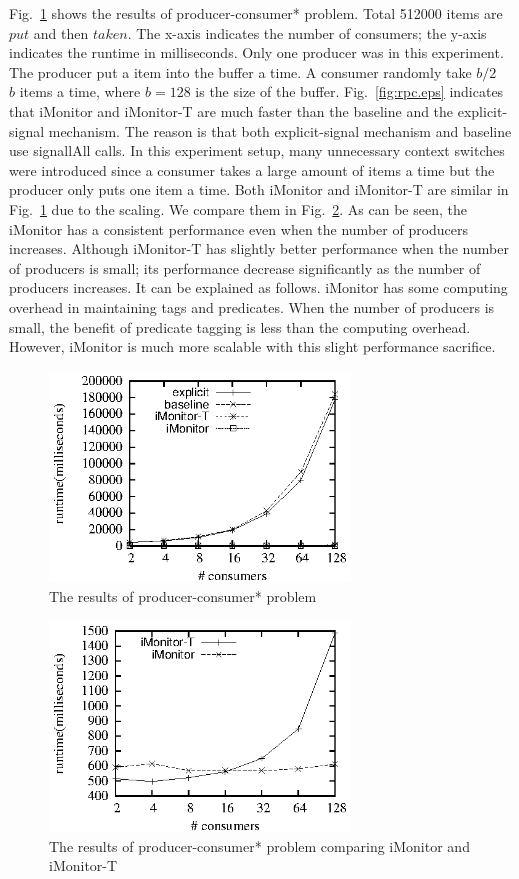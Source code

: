 \documentclass[preprint]{sigplanconf}
\begin{document}
Fig.~\ref{fig:rpc_eval} shows the results of producer-consumer* problem. Total
512000 items are $put$ and then $taken$. The x-axis indicates the number of 
consumers; the y-axis indicates the runtime in milliseconds. Only one producer
was in this experiment. The producer put a item into the buffer a time. A 
consumer randomly take $b/2$ ~ $b$ items a time, where $b = 128$ is the size of 
the buffer. Fig.~\ref{fig:rpc.eps} indicates that iMonitor and iMonitor-T are
much faster than the baseline and the explicit-signal mechanism. The reason is
that both explicit-signal mechanism and baseline use signallAll calls. In this
experiment setup, many unnecessary context switches were introduced since a
consumer takes a large amount of items a time but the producer only puts one
item a time. Both iMonitor and iMonitor-T are similar in
Fig.~\ref{fig:rpc_eval} due to the scaling. We compare them in
Fig.~\ref{fig:rpch_eval}. As can be seen, the iMonitor has a consistent
performance even when the number of producers increases. Although iMonitor-T has
slightly better performance when the number of producers is small; its 
performance decrease significantly as the number of producers increases. It can
be explained as follows. iMonitor has some computing overhead in maintaining 
tags and predicates. When the number of producers is small, the benefit of
predicate tagging is less than the computing overhead. However, iMonitor is
much more scalable with this slight performance sacrifice.

\begin{figure}[ht!]
  \centering
  \includegraphics[width=80mm]{fig/rpc.eps}
  \caption{The results of producer-consumer* problem}
  \label{fig:rpc_eval}
\end{figure}

\begin{figure}[ht!]
  \centering
  \includegraphics[width=80mm]{fig/rpch.eps}
  \caption{The results of producer-consumer* problem comparing iMonitor and
  iMonitor-T}
  \label{fig:rpch_eval}
\end{figure}
\end{document}
